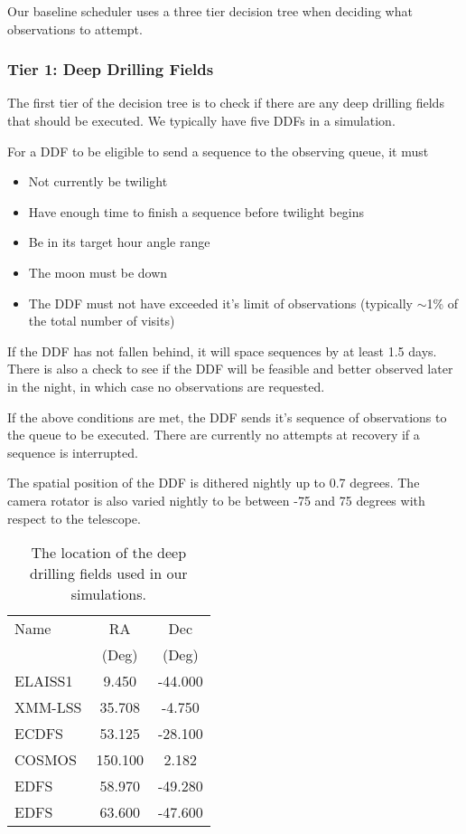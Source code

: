 Our baseline scheduler uses a three tier decision tree when deciding what observations to attempt. 

\subsubsection{Tier 1:  Deep Drilling Fields}

The first tier of the decision tree is to check if there are any deep drilling fields that should be executed. We typically have five DDFs in a simulation. 

For a DDF to be eligible to send a sequence to the observing queue, it must
\begin{itemize}
\item{Not currently be twilight}
\item{Have enough time to finish a sequence before twilight begins}
\item{Be in its target hour angle range}
\item{The moon must be down}
\item{The DDF must not have exceeded it's limit of observations (typically $\sim$1\% of the total number of visits)}
\end{itemize}

If the DDF has not fallen behind, it will space sequences by at least 1.5 days. There is also a check to see if the DDF will be feasible and better observed later in the night, in which case no observations are requested.

If the above conditions are met, the DDF sends it's sequence of observations to the queue to be executed. There are currently no attempts at recovery if a sequence is interrupted. 

The spatial position of the DDF is dithered nightly up to 0.7 degrees.  The camera rotator is also varied nightly to be between -75 and 75 degrees with respect to the telescope. 

\begin{table}
\begin{centering}
\begin{tabular}{lcc}
\toprule
    Name &      RA &     Dec \\
    &          (Deg) &  (Deg) \\
    \hline
 ELAISS1 &   9.450 & -44.000 \\
 XMM-LSS &  35.708 &  -4.750 \\
   ECDFS &  53.125 & -28.100 \\
  COSMOS & 150.100 &   2.182 \\
    EDFS &  58.970 & -49.280 \\
    EDFS &  63.600 & -47.600 \\
    \hline
\end{tabular}
\caption{The location of the deep drilling fields used in our simulations.}\label{table:ddfs}
\end{centering}
\end{table}



